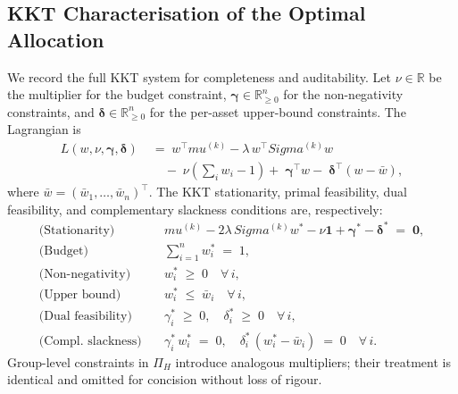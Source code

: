 \documentclass[12pt,openany]{book}
\newcommand{\bfw}{\mathbf{w}}
\newcommand{\bfmu}{\boldsymbol{\mu}}
\newcommand{\bfSigma}{\boldsymbol{\Sigma}}
\newcommand{\bfone}{\mathbf{1}}
\newcommand{\bfgamma}{\boldsymbol{\gamma}}
\newcommand{\bfdelta}{\boldsymbol{\delta}}
\newcommand{\bfzero}{\mathbf{0}}
\numberwithin{equation}{chapter}
\theoremstyle{plain}
\theoremstyle{definition}
\theoremstyle{remark}
\def\mathcal#1{#1}%
\def\bfw{w}%
\def\bfmu{mu}%
\def\bfSigma{Sigma}%
\begin{document}
\subsection{KKT Characterisation of the Optimal Allocation}
\label{ssec:kkt}

We record the full KKT system for completeness and auditability.
Let $\nu \in \mathbb{R}$ be the multiplier for the budget
constraint, $\bfgamma \in \mathbb{R}^n_{\geq 0}$ for the
non-negativity constraints, and $\bfdelta \in \mathbb{R}^n_{\geq 0}$
for the per-asset upper-bound constraints.  The Lagrangian is
\begin{align}
  \mathcal{L}(\bfw,\nu,\bfgamma,\bfdelta)
  \;&=\;
  \bfw^\top\bfmu^{(k)}
  - \lambda\,\bfw^\top\bfSigma^{(k)}\bfw
  \nonumber\\
  &\quad
  -\;\nu\!\left(\textstyle\sum_i w_i - 1\right)
  +\;\bfgamma^\top\bfw
  -\;\bfdelta^\top(\bfw - \bar{\bfw}),
  \label{eq:lagrangian}
\end{align}
where $\bar{\bfw} = (\bar{w}_1,\dots,\bar{w}_n)^\top$.  The
KKT stationarity, primal feasibility, dual feasibility, and
complementary slackness conditions are, respectively:
\begin{align}
  \text{(Stationarity)}\quad
  &\bfmu^{(k)} - 2\lambda\,\bfSigma^{(k)}\bfw^{*}
   - \nu\bfone + \bfgamma^{*} - \bfdelta^{*}
   \;=\; \bfzero,
  \label{eq:kkt-stat}\\[4pt]
  \text{(Budget)}\quad
  &\textstyle\sum_{i=1}^n w_i^{*} \;=\; 1,
  \label{eq:kkt-budget}\\[4pt]
  \text{(Non-negativity)}\quad
  &w_i^{*} \;\geq\; 0 \quad \forall\,i,
  \label{eq:kkt-nn}\\[4pt]
  \text{(Upper bound)}\quad
  &w_i^{*} \;\leq\; \bar{w}_i \quad \forall\,i,
  \label{eq:kkt-ub}\\[4pt]
  \text{(Dual feasibility)}\quad
  &\gamma_i^{*} \;\geq\; 0,\quad
   \delta_i^{*} \;\geq\; 0 \quad \forall\,i,
  \label{eq:kkt-dual}\\[4pt]
  \text{(Compl.\ slackness)}\quad
  &\gamma_i^{*}\,w_i^{*} \;=\; 0,\quad
   \delta_i^{*}\,(w_i^{*} - \bar{w}_i) \;=\; 0
   \quad \forall\,i.
  \label{eq:kkt-cs}
\end{align}
Group-level constraints in $\Pi_H$ introduce analogous
multipliers; their treatment is identical and omitted for
concision without loss of rigour.

\end{document}
